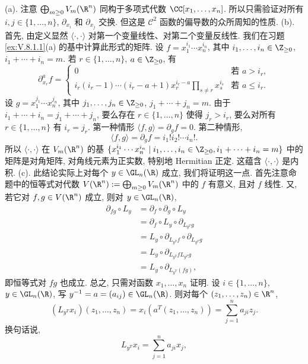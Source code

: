 \begin{solution}
(a). 注意 $\bigoplus_{m \geq 0}V_m(\R^n)$ 同构于多项式代数 $\CC[x_1, \ldots, x_n]$. 所以只需验证对所有 $i, j \in \{1, \ldots, n\}$, $\partial_{x_i}$ 和 $\partial_{x_j}$ 交换. 但这是 $\mathcal{C}^2$ 函数的偏导数的众所周知的性质.
(b). 首先, 由定义显然 $\langle \cdot, \cdot \rangle$ 对第一个变量线性、对第二个变量反线性. 我们在习题 \ref{ex:V.8.1.1}(a) 的基中计算此形式的矩阵.
设 $f = x_1^{i_1}\cdots x_n^{i_n}$, 其中 $i_1, \ldots, i_n \in \Z_{\geq 0}$, $i_1 + \cdots + i_n = m$. 若 $r \in \{1, \ldots, n\}$, $a \in \Z_{\geq 0}$, 有
\[
\partial_{x_r}^a f = \begin{cases} 0 & \text{若 } a > i_r, \\ i_r(i_r - 1)\cdots(i_r - a + 1)x_r^{i_r - a}\prod_{s \neq r}x_s^{i_s} & \text{若 } a \leq i_r. \end{cases}
\]
设 $g = x_1^{j_1}\cdots x_n^{j_n}$, 其中 $j_1, \ldots, j_n \in \Z_{\geq 0}$, $j_1 + \cdots + j_n = m$. 由于 $i_1 + \cdots + i_n = j_1 + \cdots + j_n$, 要么存在 $r \in \{1, \ldots, n\}$ 使得 $j_r > i_r$, 要么对所有 $r \in \{1, \ldots, n\}$ 有 $i_r = j_r$. 第一种情形 $\langle f, g \rangle = \partial_g f = 0$. 第二种情形,
\[
\langle f, g \rangle = \partial_g f = i_1!i_2!\cdots i_n!.
\]
所以 $\langle \cdot, \cdot \rangle$ 在 $V_m(\R^n)$ 的基 $\{x_1^{i_1}\cdots x_n^{i_n} \mid i_1, \ldots, i_n \in \Z_{\geq 0}, i_1 + \cdots + i_n = m\}$ 中的矩阵是对角矩阵, 对角线元素为正实数, 特别地 Hermitian 正定. 这蕴含 $\langle \cdot, \cdot \rangle$ 是内积.
(c). 此结论实际上对每个 $y \in \GL_n(\R)$ 成立, 我们将证明这一点.
首先注意命题中的恒等式对代数 $V(\R^n) := \bigoplus_{m \geq 0}V_m(\R^n)$ 中的 $f$ 有意义, 且对 $f$ 线性. 又, 若它对 $f, g \in V(\R^n)$ 成立, 则对 $y \in \GL_n(\R)$,
\begin{align*}
\partial_{fg} \circ L_y &= \partial_f \circ \partial_g \circ L_y \\
&= \partial_f \circ L_y \circ \partial_{L_{y^T}g} \\
&= L_y \circ \partial_{L_{y^T}f} \circ \partial_{L_{y^T}g} \\
&= L_y \circ \partial_{L_{y^T}fL_{y^T}g} \\
&= L_y \circ \partial_{L_{y^T}(fg)},
\end{align*}
即恒等式对 $fg$ 也成立. 总之, 只需对函数 $x_1, \ldots, x_n$ 证明.
设 $i \in \{1, \ldots, n\}$, $y \in \GL_n(\R)$, 写 $y^{-1} = a = (a_{ij}) \in \GL_n(\R)$. 则对每个 $(z_1, \ldots, z_n) \in \R^n$,
\[
(L_{y^T}x_i)(z_1, \ldots, z_n) = x_i(a^T(z_1, \ldots, z_n)) = \sum_{j=1}^n a_{ji}z_j.
\]
换句话说,
\[
L_{y^T}x_i = \sum_{j=1}^n a_{ji}x_j,
\]
\end{solution}
